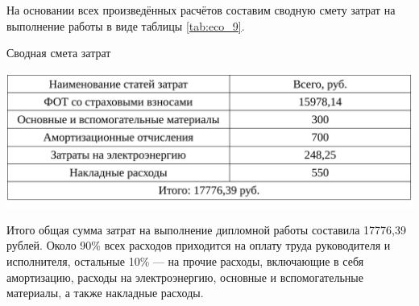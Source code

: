 На основании всех произведённых расчётов составим сводную смету затрат на выполнение работы в виде таблицы \ref{tab:eco_9}.

\begin{table}[ht!]
\caption{Сводная смета затрат}
\centering
\includegraphics[page=1, width=1\linewidth]{tables/economics/econom_4.pdf}
\label{tab:eco_9}
\end{table}

Итого общая сумма затрат на выполнение дипломной работы составила 17776,39 рублей.
Около 90\% всех расходов приходится на оплату труда руководителя и исполнителя, остальные 10\% --- 
на прочие расходы, включающие в себя амортизацию, расходы на электроэнергию, основные и вспомогательные
материалы, а также накладные расходы.


%  
% 